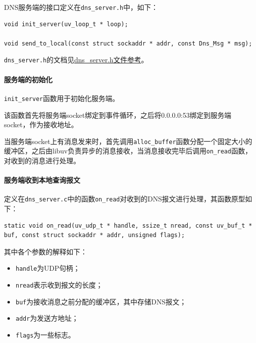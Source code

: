 \documentclass[lang=cn,11pt,a4paper,cite=authornum]{paper}
\begin{document}
DNS服务端的接口定义在\texttt{dns_server.h}中，如下：

\begin{code}
\begin{verbatim}
void init_server(uv_loop_t * loop);

void send_to_local(const struct sockaddr * addr, const Dns_Msg * msg);
\end{verbatim}
\end{code}

\texttt{dns_server.h}的文档见\href{run:./APIdoc/dns__server_8h.html}{dns\_server.h文件参考}。

\paragraph{服务端的初始化}

\texttt{init_server}函数用于初始化服务端。

该函数首先将服务端socket绑定到事件循环，之后将0.0.0.0:53绑定到服务端socket，作为接收地址。

当服务端socket上有消息发来时，首先调用\texttt{alloc_buffer}函数分配一个固定大小的缓冲区，之后由libuv负责异步的消息接收，当消息接收完毕后调用\texttt{on_read}函数，对收到的消息进行处理。

\paragraph{服务端收到本地查询报文}

定义在\texttt{dns_server.c}中的函数\texttt{on_read}对收到的DNS报文进行处理，其函数原型如下：

\begin{code}
\begin{verbatim}
static void on_read(uv_udp_t * handle, ssize_t nread, const uv_buf_t * buf, const struct sockaddr * addr, unsigned flags);
\end{verbatim}
\end{code}

其中各个参数的解释如下：

\begin{itemize}
    \item \texttt{handle}为UDP句柄；
    \item \texttt{nread}表示收到报文的长度；
    \item \texttt{buf}为接收消息之前分配的缓冲区，其中存储DNS报文；
    \item \texttt{addr}为发送方地址；
    \item \texttt{flags}为一些标志。
\end{itemize}
\end{document}
